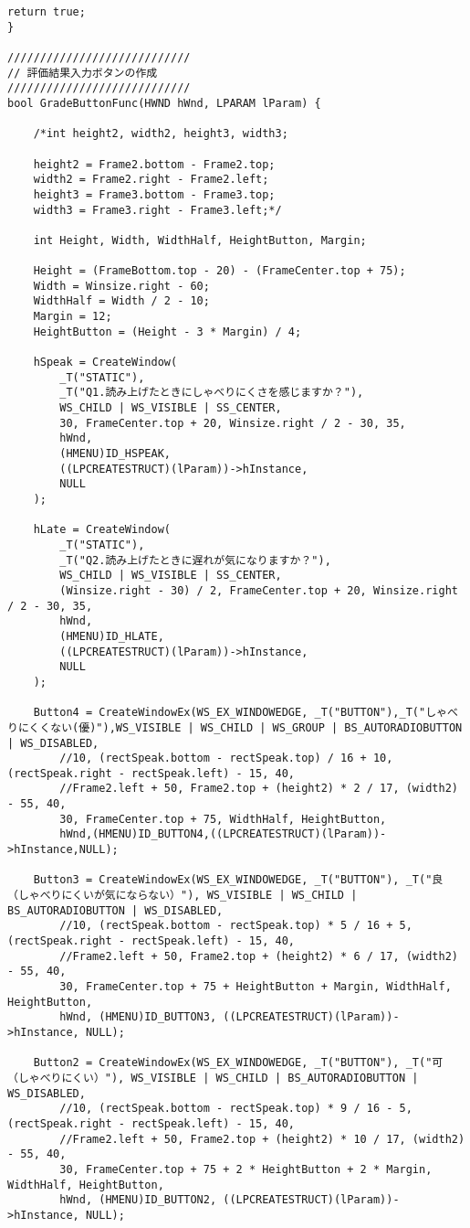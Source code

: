 \begin{lstlisting}[caption=window.cpp]
	return true;
}

////////////////////////////
// 評価結果入力ボタンの作成
////////////////////////////
bool GradeButtonFunc(HWND hWnd, LPARAM lParam) {

	/*int height2, width2, height3, width3;

	height2 = Frame2.bottom - Frame2.top;
	width2 = Frame2.right - Frame2.left;
	height3 = Frame3.bottom - Frame3.top;
	width3 = Frame3.right - Frame3.left;*/

	int Height, Width, WidthHalf, HeightButton, Margin;

	Height = (FrameBottom.top - 20) - (FrameCenter.top + 75);
	Width = Winsize.right - 60;
	WidthHalf = Width / 2 - 10;
	Margin = 12;
	HeightButton = (Height - 3 * Margin) / 4;

	hSpeak = CreateWindow(
		_T("STATIC"),
		_T("Q1.読み上げたときにしゃべりにくさを感じますか？"),
		WS_CHILD | WS_VISIBLE | SS_CENTER,
		30, FrameCenter.top + 20, Winsize.right / 2 - 30, 35,
		hWnd,
		(HMENU)ID_HSPEAK,
		((LPCREATESTRUCT)(lParam))->hInstance,
		NULL
	);

	hLate = CreateWindow(
		_T("STATIC"),
		_T("Q2.読み上げたときに遅れが気になりますか？"),
		WS_CHILD | WS_VISIBLE | SS_CENTER,
		(Winsize.right - 30) / 2, FrameCenter.top + 20, Winsize.right / 2 - 30, 35,
		hWnd,
		(HMENU)ID_HLATE,
		((LPCREATESTRUCT)(lParam))->hInstance,
		NULL
	);

	Button4 = CreateWindowEx(WS_EX_WINDOWEDGE, _T("BUTTON"),_T("しゃべりにくくない(優)"),WS_VISIBLE | WS_CHILD | WS_GROUP | BS_AUTORADIOBUTTON | WS_DISABLED,
		//10, (rectSpeak.bottom - rectSpeak.top) / 16 + 10, (rectSpeak.right - rectSpeak.left) - 15, 40,
		//Frame2.left + 50, Frame2.top + (height2) * 2 / 17, (width2) - 55, 40,
		30, FrameCenter.top + 75, WidthHalf, HeightButton,
		hWnd,(HMENU)ID_BUTTON4,((LPCREATESTRUCT)(lParam))->hInstance,NULL);

	Button3 = CreateWindowEx(WS_EX_WINDOWEDGE, _T("BUTTON"), _T("良　（しゃべりにくいが気にならない）"), WS_VISIBLE | WS_CHILD | BS_AUTORADIOBUTTON | WS_DISABLED,
		//10, (rectSpeak.bottom - rectSpeak.top) * 5 / 16 + 5, (rectSpeak.right - rectSpeak.left) - 15, 40,
		//Frame2.left + 50, Frame2.top + (height2) * 6 / 17, (width2) - 55, 40,
		30, FrameCenter.top + 75 + HeightButton + Margin, WidthHalf, HeightButton,
		hWnd, (HMENU)ID_BUTTON3, ((LPCREATESTRUCT)(lParam))->hInstance, NULL);

	Button2 = CreateWindowEx(WS_EX_WINDOWEDGE, _T("BUTTON"), _T("可　（しゃべりにくい）"), WS_VISIBLE | WS_CHILD | BS_AUTORADIOBUTTON | WS_DISABLED,
		//10, (rectSpeak.bottom - rectSpeak.top) * 9 / 16 - 5, (rectSpeak.right - rectSpeak.left) - 15, 40,
		//Frame2.left + 50, Frame2.top + (height2) * 10 / 17, (width2) - 55, 40,
		30, FrameCenter.top + 75 + 2 * HeightButton + 2 * Margin, WidthHalf, HeightButton,
		hWnd, (HMENU)ID_BUTTON2, ((LPCREATESTRUCT)(lParam))->hInstance, NULL);


\end{lstlisting}
